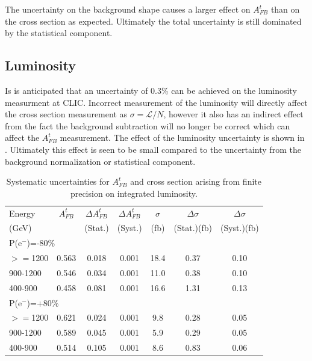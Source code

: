The uncertainty on the background shape causes a larger effect on $A_{FB}^t$ than on the cross section as expected. Ultimately the total uncertainty is still dominated by the statistical component. 

\subsection{Luminosity}

Is is anticipated that an uncertainty of 0.3\% can be achieved on the luminosity measurment at \ac{CLIC}. Incorrect measurement of the luminosity will directly affect the cross section measurement as $\sigma= \mathcal{L}/N$, however it also has an indirect effect from the fact the background subtraction will no longer be correct which can affect the $A_{FB}^t$ measurement. The effect of the luminosity uncertainty is shown in . Ultimately this effect is seen to be small compared to the uncertainty from the background normalization or statistical component.

\begin{table}
  \centering
  \begin{tabular}{l|c|c|c|c|c|c}
    \toprule
     Energy & $A_{FB}^t$ & $\Delta A_{FB}^t$  & $\Delta A^t_{FB}$ &  $\sigma$  &  $\Delta\sigma$  &  $\Delta\sigma$ \\
     (GeV) &  & (Stat.) & (Syst.) &  (fb) &  (Stat.)(fb) &  (Syst.)(fb)\\
     \midrule
     \midrule
     \multicolumn{7}{l}{P(e$^-$)=-80\%} \\
     \midrule
     \midrule
    $>=$1200   & 0.563 & 0.018 & 0.001 & 18.4 & 0.37 & 0.10\\
    \midrule
    900-1200   & 0.546 & 0.034 & 0.001 & 11.0 & 0.38 & 0.10\\
    \midrule
    400-900    & 0.458 & 0.081 & 0.001 & 16.6 & 1.31 & 0.13\\
    \midrule
    \midrule
   \multicolumn{7}{l}{ P(e$^-$)=+80\%}\\
    \midrule
    \midrule
    $>=$1200  & 0.621 & 0.024 & 0.001 & 9.8 & 0.28 & 0.05 \\
    \midrule
    900-1200  & 0.589 & 0.045 & 0.001 & 5.9 & 0.29 & 0.05 \\
    \midrule
    400-900   & 0.514 & 0.105 & 0.001 & 8.6 & 0.83 & 0.06 \\
    \bottomrule
  \end{tabular}
  \caption{Systematic uncertainties for $A_{FB}^t$ and cross section arising from finite precision on integrated luminosity.}
  \label{tab:lumisys}
\end{table}


